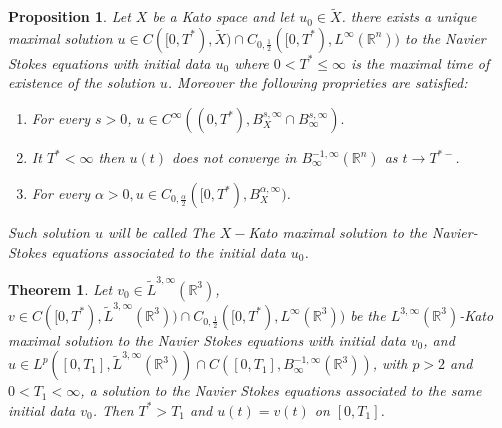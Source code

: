 \documentclass[10pt,a4paper]{amsart}
\newtheorem{proposition}{Proposition}
\newtheorem{theorem}{Theorem}
\begin{document}
\begin{proposition}\label{Ram}
Let $X$ be a Kato space and let $u_0\in\tilde{X}$. there exists a unique maximal solution $u\in C([0,T^\ast),\tilde{X})\cap C_{0,\frac{1}{2}}([0,T^\ast),L^\infty(\mathbb{R}^n))$ to the Navier Stokes equations with initial data $u_0$ where $0<T^\ast\leq \infty$ is the maximal time of existence of the solution $u$. Moreover the following proprieties are satisfied:
\begin{enumerate}
    \item For every $s>0$, $u\in C^\infty((0,T^\ast),B^{s,\infty}_X\cap B^{s,\infty}_\infty).$
    \item It $T^\ast< \infty$ then $u(t)$ does not converge in $B^{-1,\infty}_\infty(\mathbb{R}^n)$ as $t\to T^{\ast -}$.
    \item For every $\alpha>0, u\in C_{0,\frac{\alpha}{2}}([0,T^\ast),B^{\alpha,\infty}_X)$.
\end{enumerate}
Such solution $u$ will be called The $X-$Kato maximal solution to the Navier-Stokes equations associated to the initial data $u_0$.
\end{proposition}

\begin{theorem}\label{WS}
Let $v_0\in\tilde{L}^{3,\infty}(\mathbb{R}^3)$, $v\in C([0,T^\ast),\tilde{L}^{3,\infty}(\mathbb{R}^3))\cap C_{0,\frac{1}{2}}([0,T^\ast),L^\infty(\mathbb{R}^3))$ be the  $ {L}^{3,\infty}(\mathbb{R}^3)$-Kato maximal solution to the Navier Stokes equations with initial data $v_0$, and $u\in L^p([0,T_1],\tilde{L}^{3,\infty}(\mathbb{R}^3))\cap C([0,T_1],B^{-1,\infty}_\infty(\mathbb{R}^3))$, with $p>2$ and $0<T_1<\infty$, a solution to the Navier Stokes equations associated to the same initial data $v_0$. Then $T^\ast>T_1$ and $u(t)=v(t)$ on $[0,T_1]$.
\end{theorem}
\end{document}
